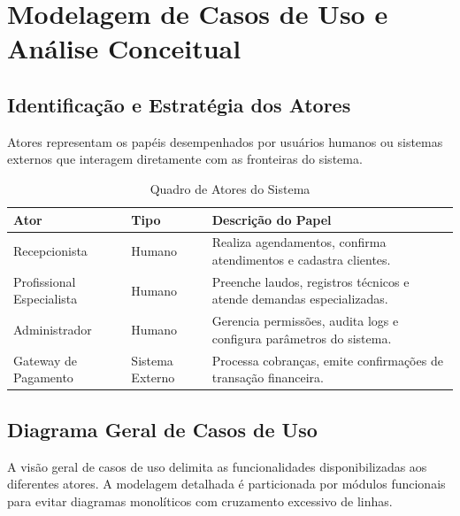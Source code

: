 \chapter{Modelagem de Casos de Uso e Análise Conceitual}
\label{chap:modelagem_casos_uso}

\section{Identificação e Estratégia dos Atores}
Atores representam os papéis desempenhados por usuários humanos ou sistemas externos que interagem diretamente com as fronteiras do sistema.

\begin{table}[htbp]
\caption{Quadro de Atores do Sistema}
\label{tab:atores_sistema}
\centering
\small
\begin{tabularx}{\textwidth}{@{} l l Y @{}}
\toprule
\textbf{Ator} & \textbf{Tipo} & \textbf{Descrição do Papel} \\
\midrule
Recepcionista & Humano & Realiza agendamentos, confirma atendimentos e cadastra clientes. \\
Profissional Especialista & Humano & Preenche laudos, registros técnicos e atende demandas especializadas. \\
Administrador & Humano & Gerencia permissões, audita logs e configura parâmetros do sistema. \\
Gateway de Pagamento & Sistema Externo & Processa cobranças, emite confirmações de transação financeira. \\
\bottomrule
\end{tabularx}
\end{table}

\section{Diagrama Geral de Casos de Uso}
A visão geral de casos de uso delimita as funcionalidades disponibilizadas aos diferentes atores. A modelagem detalhada é particionada por módulos funcionais para evitar diagramas monolíticos com cruzamento excessivo de linhas.

